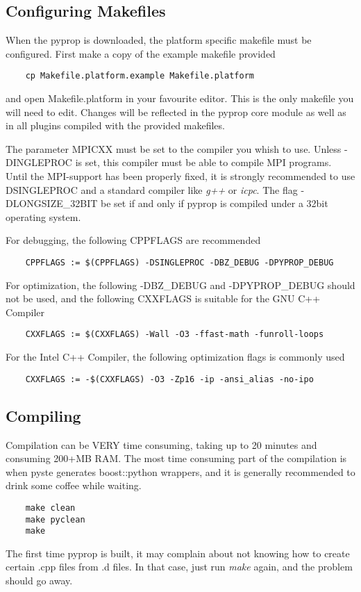 \subsection*{Configuring Makefiles}
When the pyprop is downloaded, the platform specific makefile must be configured. First make
a copy of the example makefile provided
\begin{verbatim}
	cp Makefile.platform.example Makefile.platform
\end{verbatim}
and open Makefile.platform in your favourite editor. This is the only makefile you will need to edit. 
Changes will be reflected in the pyprop core module as well as in all plugins compiled with the provided
makefiles.

The parameter MPICXX must be set to the compiler you whish to use. Unless -DINGLEPROC is set, this compiler
must be able to compile MPI programs. Until the MPI-support has been properly fixed, it is strongly recommended
to use \-DSINGLEPROC and a standard compiler like \textit{g++} or \textit{icpc}.
The flag -DLONGSIZE\_32BIT be set if and only if pyprop is compiled under a 32bit operating system.

For debugging, the following CPPFLAGS are recommended
\begin{verbatim}
	CPPFLAGS := $(CPPFLAGS) -DSINGLEPROC -DBZ_DEBUG -DPYPROP_DEBUG
\end{verbatim}
For optimization, the following -DBZ\_DEBUG and -DPYPROP\_DEBUG should not be used, and the following
CXXFLAGS is suitable for the GNU C++ Compiler
\begin{verbatim}
	CXXFLAGS := $(CXXFLAGS) -Wall -O3 -ffast-math -funroll-loops
\end{verbatim}
For the Intel C++ Compiler, the following optimization flags is commonly used
\begin{verbatim}
	CXXFLAGS := -$(CXXFLAGS) -O3 -Zp16 -ip -ansi_alias -no-ipo
\end{verbatim}

\subsection*{Compiling}
Compilation can be VERY time consuming, taking up to 20 minutes and consuming 200+MB RAM. 
The most time consuming part of the compilation is when pyste generates boost::python wrappers, and
it is generally recommended to drink some coffee while waiting.
\begin{verbatim}
	make clean
	make pyclean
	make
\end{verbatim}
The first time pyprop is built, it may complain about not knowing how to create certain .cpp files from
.d files. In that case, just run \textit{make} again, and the problem should go away.


